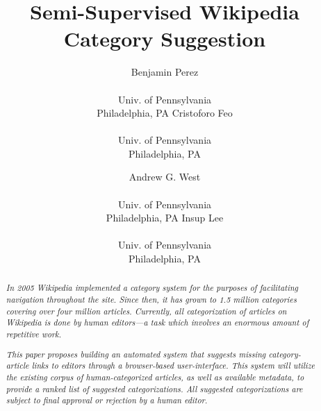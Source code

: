 \documentclass[]{sig-alternate}
\begin{document}
 

\title{Semi-Supervised Wikipedia Category Suggestion}
\subtitle{}
\author{
	\alignauthor Benjamin Perez \\  \\ Univ. of Pennsylvania \\ Philadelphia, PA
	\alignauthor Cristoforo Feo \\    \\ Univ. of Pennsylvania \\ Philadelphia, PA
\and
	\alignauthor Andrew G. West \\  \\ Univ. of Pennsylvania \\ Philadelphia, PA
	\alignauthor Insup Lee      \\      \\ Univ. of Pennsylvania \\ Philadelphia, PA
}
\date{}
\maketitle


\begin{abstract}
\textit{In 2005 Wikipedia implemented a category system for the purposes of facilitating navigation throughout the site. Since then, it has grown to 1.5 million categories covering over four million articles. Currently, all categorization of articles on Wikipedia is done by human editors---a task which involves an enormous amount of repetitive work.}

\textit{This paper proposes building an automated system that suggests missing category-article links to editors through a browser-based user-interface. This system will utilize the existing corpus of human-categorized articles, as well as available metadata, to provide a ranked list of suggested categorizations. All suggested categorizations are subject to final approval or rejection by a human editor.}
\end{abstract}
\end{document}
